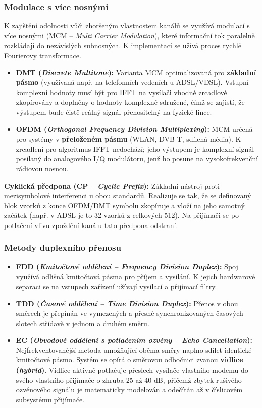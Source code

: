     \subsubsection{Modulace s více nosnými}
        K zajištění odolnosti vůči zhoršeným vlastnostem kanálů se využívá modulací s více nosnými (MCM -- \textit{Multi Carrier Modulation}), které informační tok paralelně rozkládají do nezávislých subnosných. K implementaci se užívá proces rychlé Fourierovy transformace.
        \begin{itemize}
            \item \textbf{DMT (\textit{Discrete Multitone}):} Varianta MCM optimalizovaná pro \textbf{základní pásmo} (využívaná např. na telefonních vedeních u ADSL/VDSL). Vstupní komplexní hodnoty musí být pro IFFT na vysílači vhodně zrcadlově zkopírovány a doplněny o hodnoty komplexně sdružené, čímž se zajistí, že výstupem bude čistě reálný signál přenositelný na fyzické lince.
            \item \textbf{OFDM (\textit{Orthogonal Frequency Division Multiplexing}):} MCM určená pro systémy v \textbf{přeloženém pásmu} (WLAN, DVB-T, sdílená média). K zrcadlení pro algoritmus IFFT nedochází; jeho výstupem je komplexní signál posílaný do analogového I/Q modulátoru, jenž ho posune na vysokofrekvenční rádiovou nosnou.
        \end{itemize}
        \textbf{Cyklická předpona (CP -- \textit{Cyclic Prefix}):} Základní nástroj proti mezisymbolové interferenci u obou standardů. Realizuje se tak, že se definovaný blok vzorků z konce OFDM/DMT symbolu zkopíruje a vloží na jeho samotný začátek (např. v ADSL je to 32 vzorků z celkových 512). Na přijímači se po potlačení vlivu zpoždění kanálu tato předpona odstraní.
    \subsubsection{Metody duplexního přenosu}
        \begin{itemize}
            \item \textbf{FDD (\textit{Kmitočtové oddělení -- Frequency Division Duplex}):} Spoj využívá odlišná kmitočtová pásma pro příjem a vysílání. K jejich hardwarové separaci se na vstupech zařízení užívají vysílací a přijímací filtry.
            \item \textbf{TDD (\textit{Časové oddělení -- Time Division Duplex}):} Přenos v obou směrech je přepínán ve vymezených a přesně synchronizovaných časových slotech střídavě v jednom a druhém směru.
            \item \textbf{EC (\textit{Obvodové oddělení s potlačením ozvěny -- Echo Cancellation}):} Nejfrekventovanější metoda umožňující oběma směry naplno sdílet identické kmitočtové pásmo. Systém se opírá o směrovou odbočnici zvanou \textbf{vidlice (\textit{hybrid})}. Vidlice aktivně potlačuje přeslech vysílače vlastního modemu do svého vlastního přijímače o zhruba 25 až 40 dB, přičemž zbytek rušivého ozvěnového signálu je matematicky modelován a odečítán až v číslicovém subsystému přijímače.
        \end{itemize}